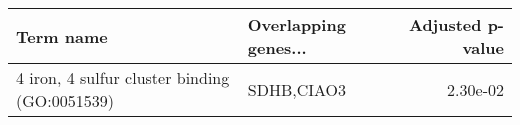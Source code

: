 \begin{tabular}{llr}
\toprule
                                    Term name & Overlapping genes... &  Adjusted p-value \\
\midrule
4 iron, 4 sulfur cluster binding (GO:0051539) &           SDHB,CIAO3 &          2.30e-02 \\
\bottomrule
\end{tabular}
